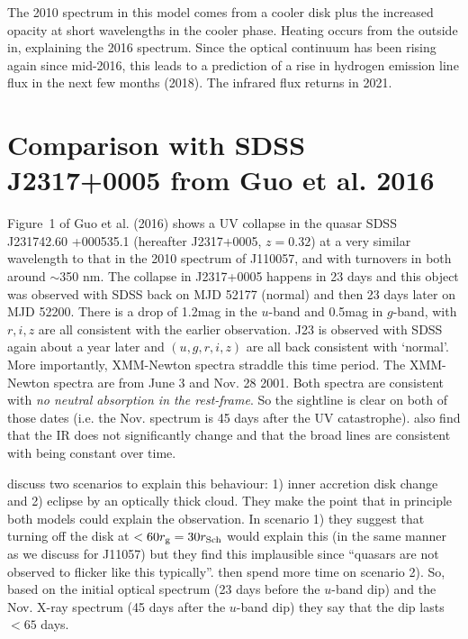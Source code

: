 \documentclass[11pt,a4paper]{article}
\begin{document}
The 2010 spectrum in this model comes from a cooler disk plus the
increased opacity at short wavelengths in the cooler phase. Heating
occurs from the outside in, explaining the 2016 spectrum.  Since the
optical continuum has been rising again since mid-2016, this leads to
a prediction of a rise in hydrogen emission line flux in the next few
months (2018). The infrared flux returns in 2021. 



\section*{Comparison with SDSS J2317+0005 from Guo et al. 2016}
Figure~1 of Guo et al. (2016) shows a UV collapse in the 
quasar SDSS  J231742.60 +000535.1 (hereafter J2317+0005, 
$z=0.32$) at a very similar wavelength to that in the 2010
spectrum of J110057, and with turnovers in both around
$\sim$350 nm.  The collapse in J2317+0005 happens in 23 days \citep[Figure 2
of ][]{Guo2016} and this object was observed with SDSS back on MJD
52177 (normal) and then 23 days later on MJD 52200. There is a drop of
1.2mag in the $u$-band and 0.5mag in $g$-band, with $r,i,z$ are all
consistent with the earlier observation. J23 is observed with SDSS
again about a year later and $(u,g,r,i,z)$ are all back consistent
with `normal'. More importantly, XMM-Newton spectra straddle this time
period. The XMM-Newton spectra are from June 3 and Nov. 28 2001. Both
spectra are consistent with {\it no neutral absorption in the
rest-frame}. So the sightline is clear on both of those dates
(i.e. the Nov. spectrum is 45 days after the UV
catastrophe). \citet{Guo2016} also find that the IR does not
significantly change and that the broad lines are consistent with
being constant over time.

\citet{Guo2016} discuss two scenarios to explain this behaviour: 1)
inner accretion disk change and 2) eclipse by an optically thick
cloud. They make the point that in principle both models could explain
the observation. In scenario 1) they suggest that turning off the disk
at $< 60 r_{\rm g} = 30 r_{\rm Sch}$ would explain this (in the same
manner as we discuss for J11057) but they find this implausible since
``quasars are not observed to flicker like this typically''.
\citet{Guo2016} then spend more time on scenario 2). So, based on the
initial optical spectrum (23 days before the $u$-band dip) and the
Nov. X-ray spectrum (45 days after the $u$-band dip) they say that the
dip lasts $< 65$ days.









\end{document}
